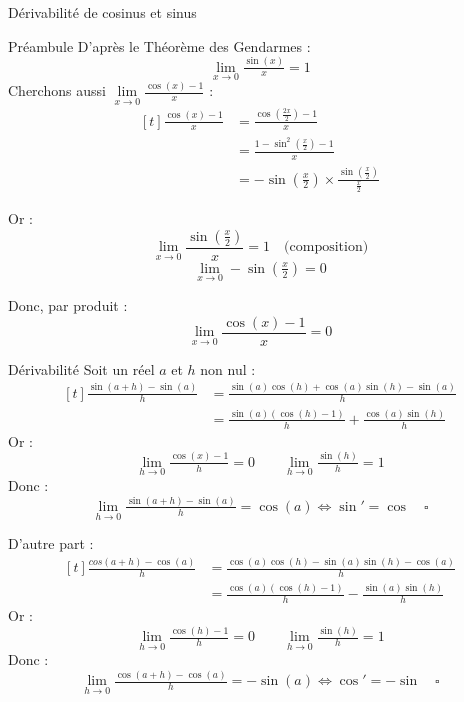 \documentclass{cours}
\let\frac\tfrac %
\begin{document}
\begin{Gpartie}{Dérivabilité de cosinus et sinus}
\begin{Spartie}{Préambule}
            D'après le Théorème des Gendarmes : \[\lim\limits_{x\to0}\frac{\sin(x)}{x}=1\]
            \vspace{2ex}
            Cherchons aussi \quad $\lim\limits_{x\to0}\frac{\cos(x)-1}{x}$ : 
            \[\begin{aligned}[t]
                \frac{\cos(x)-1}{x} &= \frac{\cos\left(\frac{2x}{2}\right)-1}{x} \\
                &= \frac{1-\sin^2\left(\frac{x}{2}\right)-1}{x} \\
                &= -\sin\left(\frac{x}{2}\right)\times\frac{\sin\left(\frac{x}{2}\right)}{\frac{x}{2}}
            \end{aligned}\]
            
            Or :  \[\lim\limits_{x\to0}\dfrac{\sin\left(\frac{x}{2}\right)}{x}=1\quad\text{(composition)}\] \[\lim\limits_{x\to0}-\sin\left(\frac{x}{2}\right)=0\]

            Donc, par produit : \[\lim\limits_{x\to0}\dfrac{\cos(x)-1}{x}=0\]
        \end{Spartie}
        \pagebreak
        \begin{Spartie}{Dérivabilité} 
            Soit un réel $a$ et $h$ non nul : 
            \[\begin{aligned}[t]
                \frac{\sin(a+h)-\sin(a)}{h} &= \frac{\sin(a)\cos(h)+\cos(a)\sin(h)-\sin(a)}{h} \\
                &= \frac{\sin(a)\left(\cos(h)-1\right)}{h}+\frac{\cos(a)\sin(h)}{h}
            \end{aligned}\]
            Or : \[\lim\limits_{h\to0}\frac{\cos(x)-1}{h}=0\qquad\lim\limits_{h\to0}\frac{\sin(h)}{h}=1\]
            Donc : \[\lim\limits_{h\to0}\frac{\sin(a+h)-\sin(a)}{h}=\cos(a)\iff\sin'=\cos\quad\square\]

            D'autre part : 
            \[\begin{aligned}[t]
                \frac{cos(a+h)-\cos(a)}{h} &= \frac{\cos(a)\cos(h)-\sin(a)\sin(h)-\cos(a)}{h} \\
                &= \frac{\cos(a)(\cos(h)-1)}{h}-\frac{\sin(a)\sin(h)}{h}
            \end{aligned}\]
            Or : \[\lim\limits_{h\to0}\frac{\cos(h)-1}{h}=0\qquad\lim\limits_{h\to0}\frac{\sin(h)}{h}=1\]
            Donc : \[\lim\limits_{h\to0}\frac{\cos(a+h)-\cos(a)}{h}=-\sin(a)\iff\cos'=-\sin\quad\square\]

        \end{Spartie}
    \end{Gpartie}
\end{document}
